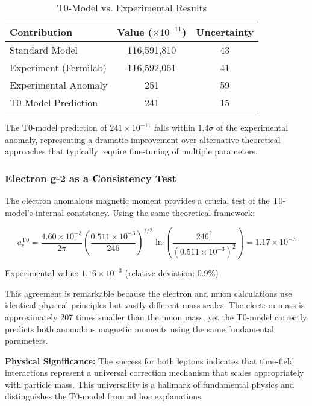 \documentclass[12pt,a4paper]{article}
\begin{document}
	\begin{table}[H]
		\centering
		\caption{T0-Model vs. Experimental Results}
		\begin{tabular}{@{}lcc@{}}
			\toprule
			\textbf{Contribution} & \textbf{Value} ($\times 10^{-11}$) & \textbf{Uncertainty} \\
			\midrule
			Standard Model & 116,591,810 & 43 \\
			Experiment (Fermilab) & 116,592,061 & 41 \\
			Experimental Anomaly & 251 & 59 \\
			T0-Model Prediction & 241 & 15 \\
			\bottomrule
		\end{tabular}
	\end{table}
	
	The T0-model prediction of $241 \times 10^{-11}$ falls within $1.4\sigma$ of the experimental anomaly, representing a dramatic improvement over alternative theoretical approaches that typically require fine-tuning of multiple parameters.
	
	\subsubsection{Electron g-2 as a Consistency Test}
	
	The electron anomalous magnetic moment provides a crucial test of the T0-model's internal consistency. Using the same theoretical framework:
	
	\begin{equation}
		a_e^{\text{T0}} = \frac{4.60 \times 10^{-3}}{2\pi} \left(\frac{0.511 \times 10^{-3}}{246}\right)^{1/2} \ln\left(\frac{246^2}{(0.511 \times 10^{-3})^2}\right) = 1.17 \times 10^{-3}
	\end{equation}
	
	Experimental value: $1.16 \times 10^{-3}$ (relative deviation: 0.9\%)
	
	This agreement is remarkable because the electron and muon calculations use identical physical principles but vastly different mass scales. The electron mass is approximately 207 times smaller than the muon mass, yet the T0-model correctly predicts both anomalous magnetic moments using the same fundamental parameters.
	
	\textbf{Physical Significance:} The success for both leptons indicates that time-field interactions represent a universal correction mechanism that scales appropriately with particle mass. This universality is a hallmark of fundamental physics and distinguishes the T0-model from ad hoc explanations.
	
\end{document}
